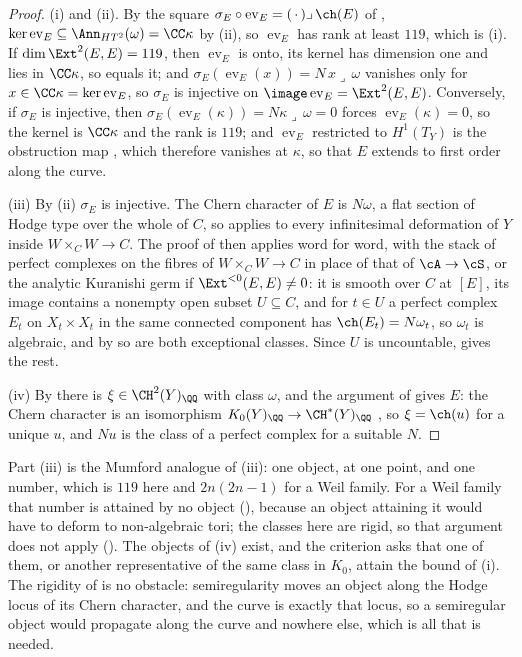 \begin{proof}
(i) and (ii). By the square $\sigma_{E}\circ\operatorname{ev}_{E}=
(\,\cdot\,)\lrcorner\,\ch(E)$ of , $\ker
\operatorname{ev}_{E}\subseteq\Ann_{HT^{2}}(\omega)=\CC\kappa$ by
(ii), so $\operatorname{ev}_{E}$ has rank at least
$119$, which is (i). If $\dim\Ext^{2}(E,E)=119$, then
$\operatorname{ev}_{E}$ is onto, its kernel has dimension one and lies in
$\CC\kappa$, so equals it; and $\sigma_{E}(\operatorname{ev}_{E}(x))=
N\,x\lrcorner\,\omega$ vanishes only for $x\in\CC\kappa=\ker
\operatorname{ev}_{E}$, so $\sigma_{E}$ is injective on
$\image\operatorname{ev}_{E}=\Ext^{2}(E,E)$. Conversely, if $\sigma_{E}$ is
injective, then $\sigma_{E}(\operatorname{ev}_{E}(\kappa))=N\kappa\lrcorner
\,\omega=0$ forces $\operatorname{ev}_{E}(\kappa)=0$, so the kernel is
$\CC\kappa$ and the rank is $119$; and $\operatorname{ev}_{E}$ restricted to
$H^{1}(T_{Y})$ is the obstruction map \cite{Tod09}, which therefore vanishes
at $\kappa$, so that $E$ extends to first order along the curve.

(iii) By (ii) $\sigma_{E}$ is injective. The Chern character of $E$ is
$N\omega$, a flat section of Hodge type over the whole of $C$, so
 applies to every infinitesimal deformation of $Y$ inside
$W\times_{C}W\to C$. The proof of  then applies word
for word, with the stack of perfect complexes on the fibres of $W\times_{C}
W\to C$ \cite{Lie06} in place of that of $\cA\to\cS$, or the analytic
Kuranishi germ if $\Ext^{<0}(E,E)\ne0$: it is smooth over $C$ at $[E]$, its
image contains a nonempty open subset $U\subseteq C$, and for $t\in U$ a
perfect complex $E_{t}$ on $X_{t}\times X_{t}$ in the same connected
component has $\ch(E_{t})=N\omega_{t}$, so $\omega_{t}$ is algebraic, and by
 so are both exceptional classes. Since $U$ is
uncountable,  gives the rest.

(iv) By  there is $\xi\in\CH^{2}(Y)_{\QQ}$ with class
$\omega$, and the argument of  gives $E$: the Chern
character is an isomorphism $K_{0}(Y)_{\QQ}\to\CH^{*}(Y)_{\QQ}$
\cite[Ex.~15.2.16(b) and Cor.~18.3.2]{Ful98}, so $\xi=\ch(u)$ for a unique
$u$, and $Nu$ is the class of a perfect complex for a suitable $N$.
\end{proof}

Part (iii) is the Mumford analogue of (iii): one object,
at one point, and one number, which is $119$ here and $2n(2n-1)$ for a Weil
family. For a Weil family that number is attained by no object
(), because an object attaining it would have to deform to
non-algebraic tori; the classes here are rigid, so that argument does not
apply (). The objects of (iv) exist, and the criterion
asks that one of them, or another representative of the same class in
$K_{0}$, attain the bound of (i). The rigidity of  is no obstacle:
semiregularity moves an object along the Hodge locus of its Chern character,
and the curve is exactly that locus, so a semiregular object would propagate
along the curve and nowhere else, which is all that is needed.

